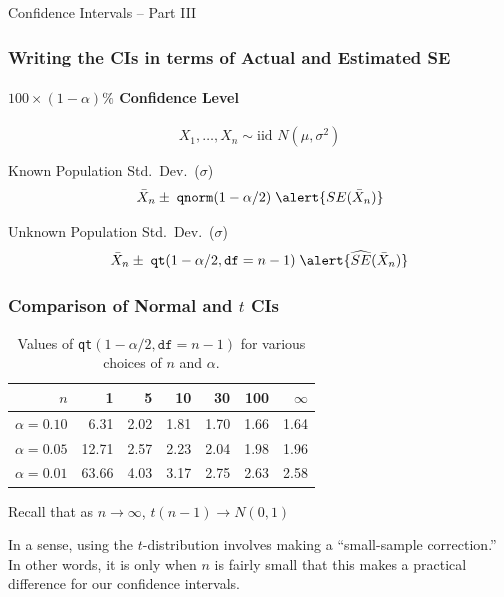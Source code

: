 \documentclass[handout]{beamer}
\date{Lecture 17}
\begin{document}
 





\begin{frame}[plain]
	\titlepage 
	

\end{frame} 




\begin{frame}

\centering \Huge Confidence Intervals -- Part III

\end{frame}


\begin{frame}
\frametitle{Writing the CIs in terms of Actual and Estimated SE}
\framesubtitle{$100\times(1-\alpha)\%$ Confidence Level}
$$\boxed{X_1, \hdots, X_n \sim \mbox{iid } N(\mu, \sigma^2)}$$

\begin{block}{Known Population Std.\ Dev.\ ($\sigma$)}
	$$\bar{X}_n \pm \; \texttt{qnorm}(1-\alpha/2) \; \alert{SE(\bar{X}_n)}$$
\end{block}

\begin{block}{Unknown Population Std.\ Dev.\ ($\sigma$)}
$$\bar{X}_n \pm \; \texttt{qt}(1-\alpha/2, \texttt{df} = n-1) \; \alert{\widehat{SE}(\bar{X}_n)}$$
\end{block}
\end{frame}

\begin{frame}
\frametitle{Comparison of Normal and $t$ CIs}
\begin{table}
\caption{Values of \texttt{qt}$(1-\alpha/2, \texttt{df}=n-1)$ for various choices of $n$ and $\alpha$. }
\begin{tabular}{r|rrrrr|r}
\hline
$n$& 1& 5& 10& 30& 100 & $\infty$\\
\hline
$\alpha = 0.10$&  6.31& 2.02 & 1.81 & 1.70  & 1.66 &1.64\\
$\alpha = 0.05$ & 12.71& 2.57 & 2.23 & 2.04  & 1.98 &1.96\\
$\alpha = 0.01$ & 63.66& 4.03 & 3.17 & 2.75  & 2.63 &2.58\\
\hline
\end{tabular}
\end{table}
\alert{Recall that as $n\rightarrow \infty$, $t(n-1) \rightarrow N(0,1)$}
\vspace{1em}


In a sense, using the $t$-distribution involves making a ``small-sample correction.'' In other words, it is only when $n$ is fairly small that this makes a practical difference for our confidence intervals.
\end{frame}
\end{document}
